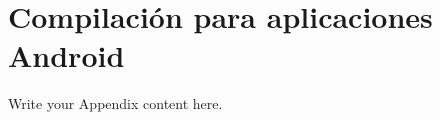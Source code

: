 
\chapter{Compilación para aplicaciones Android} %

\label{Compilación para aplicaciones Android} %

Write your Appendix content here.